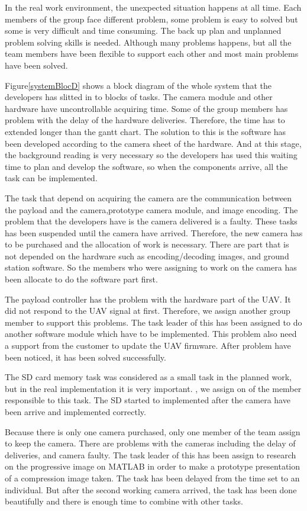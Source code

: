 In the real work environment, the unexpected situation happens at all time. 
Each members of the group face different problem, some problem is easy to solved but some is very difficult and time consuming. 
The back up plan and unplanned problem solving skills is needed. 
Although many problems happens, but all the team members have been flexible to support each other and most main problems have been solved.

Figure\ref{systemBlocD} shows a block diagram of the whole system that the developers has slitted in to blocks of tasks. 
The camera module and other hardware have uncontrollable acquiring time. 
Some of the group members has problem with the delay of the hardware deliveries. Therefore, the time has to extended longer than the gantt chart. 
The solution to this is the software has been developed according to the camera sheet of the hardware. 
And at this stage, the background reading is very necessary so the developers has used this waiting time to plan and develop the software, so when the components arrive, all the task can be implemented.

The task that depend on acquiring the camera are the communication between the payload and the camera,prototype camera module, and image encoding. 
The problem that the developers have is the camera delivered is a faulty.
These tasks has been suspended until the camera have arrived.  
Therefore, the new camera has to be purchased and the allocation of work is necessary. 
There are part that is not depended on the hardware such as encoding/decoding images, and ground station software. 
So the members who were assigning to work on the camera has been allocate to do the software part first.

The payload controller has the problem with the hardware part of the UAV. 
It did not respond to the UAV signal at first. 
Therefore, we assign another group member to support this problems. 
The task leader of this has been assigned to do another software module which have to be implemented. 
This problem also need a support from the customer to update the UAV firmware. 
After problem have been noticed, it has been solved successfully. 

The SD card memory task was considered as a small task in the planned work, but in the real implementation it is very important. 
\Therefore, we assign on of the member responsible to this task. 
The SD started to implemented after the camera have been arrive and implemented correctly. 

Because there is only one camera purchased, only one member of the team assign to keep the camera. 
There are problems with the cameras including the delay of deliveries, and camera faulty. 
The task leader of this has been assign to research on the progressive image on MATLAB in order to make a prototype presentation of a compression image taken. 
The task has been delayed from the time set to an individual. 
But after the second working camera arrived, the task has been done beautifully and there is enough time to combine with other tasks.